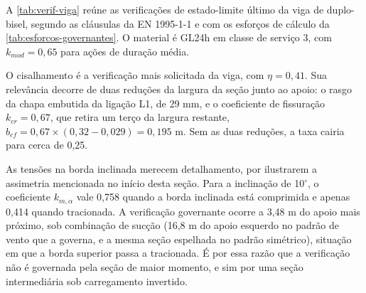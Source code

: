 A \autoref{tab:verif-viga} reúne as verificações de estado-limite último da viga
de duplo-bisel, segundo as cláusulas da EN 1995-1-1 \cite{EN1995-1-1:2004} e com
os esforços de cálculo da \autoref{tab:esforcos-governantes}. O material é GL24h
em classe de serviço 3, com $k_{mod} = 0{,}65$ para ações de duração média.


O cisalhamento é a verificação mais solicitada da viga, com $\eta = 0{,}41$.
Sua relevância decorre de duas reduções da largura da seção junto ao apoio: o
rasgo da chapa embutida da ligação L1, de 29 mm, e o coeficiente de fissuração
$k_{cr} = 0{,}67$, que retira um terço da largura restante,
$b_{ef} = 0{,}67 \times (0{,}32 - 0{,}029) = 0{,}195$ m. Sem as duas reduções, a
taxa cairia para cerca de 0,25.

As tensões na borda inclinada merecem detalhamento, por ilustrarem a assimetria
mencionada no início desta seção. Para a inclinação de
10$^{\circ}$, o coeficiente $k_{m,\alpha}$ vale 0,758 quando a borda inclinada
está comprimida e apenas 0,414 quando tracionada. A verificação governante
ocorre a 3,48 m do apoio mais próximo, sob combinação de sucção (16,8 m do apoio
esquerdo no padrão de vento que a governa, e a mesma seção espelhada no padrão
simétrico), situação em que a borda
superior passa a tracionada. É por essa razão que a verificação não é governada
pela seção de maior momento, e sim por uma seção intermediária sob carregamento
invertido.

